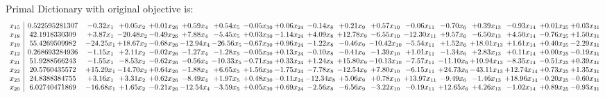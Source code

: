 \documentclass[9pt]{article}
\begin{document}
Primal Dictionary with original objective is:
\[\begin{array}{c| c c@{\hskip 2pt} c@{\hskip 2pt} c@{\hskip 2pt} c@{\hskip 2pt} c@{\hskip 2pt} c@{\hskip 2pt} c@{\hskip 2pt} c@{\hskip 2pt} c@{\hskip 2pt} c@{\hskip 2pt} c@{\hskip 2pt} c@{\hskip 2pt} c@{\hskip 2pt} c@{\hskip 2pt} c@{\hskip 2pt} c@{\hskip 2pt} }
 x_{15}   &  0.522595281307 & -0.32 x_{1} & +  0.05 x_{2} & +  0.01 x_{26} & +  0.59 x_{4} & +  0.54 x_{5} & -0.05 x_{30} & +  0.06 x_{24} & -0.14 x_{8} & +  0.21 x_{9} & +  0.57 x_{10} & -0.06 x_{11} & -0.70 x_{6} & +  0.39 x_{13} & -0.93 x_{14} & +  0.01 x_{25} & +  0.03 x_{31}\\
 x_{18}   &  42.1918330309 & +  3.87 x_{1} & -20.48 x_{2} & -0.49 x_{26} & +  7.88 x_{4} & -5.45 x_{5} & +  0.03 x_{30} & -1.14 x_{24} & +  4.09 x_{8} & + 12.78 x_{9} & -6.55 x_{10} & -12.30 x_{11} & +  9.57 x_{6} & -6.50 x_{13} & +  4.50 x_{14} & -0.76 x_{25} & +  1.50 x_{31}\\
 x_{19}   &  55.4269509982 & -24.25 x_{1} & + 18.67 x_{2} & -0.68 x_{26} & -12.94 x_{4} & -26.56 x_{5} & -0.67 x_{30} & +  0.96 x_{24} & -1.22 x_{8} & -0.46 x_{9} & -10.42 x_{10} & -5.54 x_{11} & +  1.52 x_{6} & + 18.01 x_{13} & +  1.61 x_{14} & +  0.40 x_{25} & -2.29 x_{31}\\
 x_{12}   &  0.268693284936 & -1.15 x_{1} & +  2.11 x_{2} & -0.02 x_{26} & -1.27 x_{4} & -1.28 x_{5} & -0.05 x_{30} & +  0.13 x_{24} & -0.10 x_{8} & -0.41 x_{9} & -1.39 x_{10} & +  1.01 x_{11} & -1.34 x_{6} & +  2.83 x_{13} & +  0.11 x_{14} & +  0.00 x_{25} & -0.19 x_{31}\\
 x_{21}   &  51.9288566243 & -1.55 x_{1} & -8.53 x_{2} & -0.62 x_{26} & -0.56 x_{4} & -10.33 x_{5} & -0.71 x_{30} & +  0.33 x_{24} & +  1.24 x_{8} & + 15.80 x_{9} & -10.13 x_{10} & -7.57 x_{11} & -11.10 x_{6} & + 10.94 x_{13} & -8.35 x_{14} & -0.51 x_{25} & +  0.39 x_{31}\\
 x_{22}   &  20.5760435572 & + 15.29 x_{1} & -14.70 x_{2} & +  0.64 x_{26} & -1.88 x_{4} & +  6.65 x_{5} & +  1.56 x_{30} & -1.75 x_{24} & -7.78 x_{8} & -12.54 x_{9} & +  7.80 x_{10} & -6.15 x_{11} & + 24.73 x_{6} & -43.11 x_{13} & + 12.74 x_{14} & +  0.73 x_{25} & +  1.35 x_{31}\\
 x_{23}   &  24.8388384755 & +  3.16 x_{1} & +  3.31 x_{2} & +  0.62 x_{26} & -8.49 x_{4} & +  1.97 x_{5} & +  0.48 x_{30} & -0.11 x_{24} & -12.34 x_{8} & +  5.06 x_{9} & +  0.78 x_{10} & + 13.97 x_{11} & -9.49 x_{6} & -1.46 x_{13} & + 18.96 x_{14} & -0.20 x_{25} & -0.60 x_{31}\\
 x_{20}   &  6.02740471869 & -16.68 x_{1} & +  1.65 x_{2} & -0.21 x_{26} & -12.54 x_{4} & -3.59 x_{5} & +  0.05 x_{30} & +  0.69 x_{24} & -2.56 x_{8} & -6.56 x_{9} & -3.22 x_{10} & -0.19 x_{11} & + 12.65 x_{6} & +  4.26 x_{13} & -1.02 x_{14} & +  0.89 x_{25} & -0.93 x_{31}\\

\end{array}\]
\end{document}
